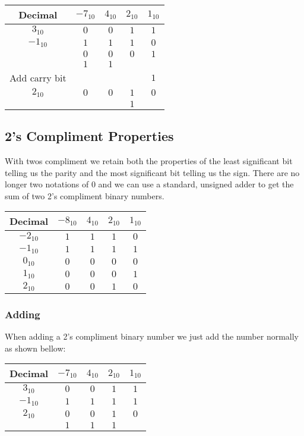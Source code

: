 \documentclass{article}
\begin{document}
\begin{center}
  \begin{tabular}{c | c | c | c | c }
    Decimal & $-7_{10}$ & $4_{10}$ & $2_{10}$ & $1_{10}$\\ \hline
    $3_{10}$ & $0$ & $0$ & $1$ & $1$\\
    $-1_{10}$ & $1$ & $1$ & $1$ & $0$\\ \hline
    & $0$ &  $0$ & $0$ & $1$\\
	& $1$ & $1$ &\\ \hline
	Add carry bit & & & &  $1$ \\
	$2_{10}$ & $0$ & $0$ & $1$ & $0$ \\ \hline
	& & & $1$ &\\
  \end{tabular}
\end{center}

\subsection{2's Compliment Properties}
With twos compliment we retain both the properties of the least significant bit telling us the parity
and the most significant bit telling us the sign. There are no longer two notations of $0$ and 
we can use a standard, unsigned adder to get the sum of two 2's compliment binary numbers.

\begin{center}
  \begin{tabular}{ | c | c | c | c | c | }
    \hline
    Decimal & $-8_{10}$ & $4_{10}$ & $2_{10}$ & $1_{10}$\\ \hline
    $-2_{10}$ & $1$ & $1$ & $1$ & $0$\\ \hline
    $-1_{10}$ & $1$ & $1$ & $1$ & $1$\\ \hline
    $0_{10}$ & $0$ &  $0$ & $0$ & $0$\\ \hline
    $1_{10}$ & $0$ & $0$ & $0$ & $1$\\ \hline
    $2_{10}$ & $0$ & $0$ & $1$ & $0$ \\
    \hline
  \end{tabular}
\end{center}

\subsubsection{Adding}
When adding a 2's compliment binary number we just add the number normally as shown bellow:

\begin{center}
  \begin{tabular}{c | c | c | c | c }
    Decimal & $-7_{10}$ & $4_{10}$ & $2_{10}$ & $1_{10}$\\ \hline
    $3_{10}$ & $0$ & $0$ & $1$ & $1$\\
    $-1_{10}$ & $1$ & $1$ & $1$ & $1$\\ \hline
    $2_{10}$& $0$ &  $0$ & $1$ & $0$\\
	& $1$ & $1$ & $1$\\
  \end{tabular}
\end{center}
\end{document}
